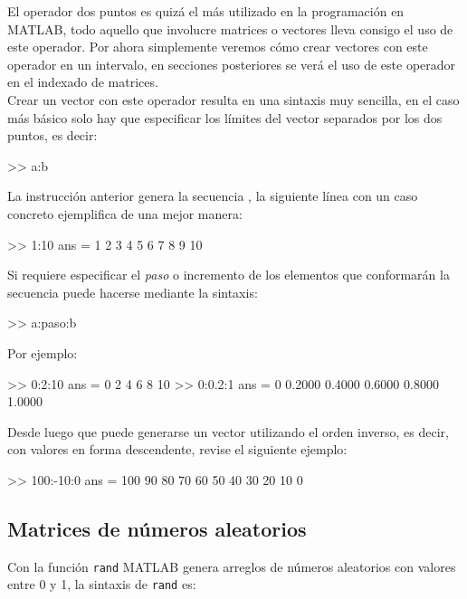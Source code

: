El operador dos puntos es quizá el más utilizado en la programación en
MATLAB, todo aquello que involucre matrices o vectores lleva consigo el
uso de este operador. Por ahora simplemente veremos cómo crear vectores
con este operador en un intervalo, en secciones posteriores se verá el
uso de este operador en el indexado de matrices.\\

Crear un vector con este operador resulta en una sintaxis muy sencilla,
en el caso más básico solo hay que especificar los límites del vector
separados por los dos puntos, es decir:

\begin{matlab}
>> a:b 
\end{matlab}

La instrucción anterior genera la secuencia , la siguiente línea con un
caso concreto ejemplifica de una mejor manera:

\begin{matlab}
>> 1:10
ans =
     1     2     3     4     5     6     7     8     9    10
\end{matlab}

Si requiere especificar el \emph{paso} o incremento de los elementos que
conformarán la secuencia puede hacerse mediante la sintaxis:

\begin{matlab}
>> a:paso:b 
\end{matlab}

Por ejemplo:

\begin{matlab}
>> 0:2:10
ans =
     0     2     4     6     8    10
>> 0:0.2:1
ans =
         0    0.2000    0.4000    0.6000    0.8000    1.0000
\end{matlab}

Desde luego que puede generarse un vector utilizando el orden inverso,
es decir, con valores en forma descendente, revise el siguiente ejemplo:

\begin{matlab}
>> 100:-10:0
ans =
   100    90    80    70    60    50    40    30    20    10     0
\end{matlab}

\subsection{Matrices de números aleatorios}\label{matrices-de-numeros-aleatorios}

Con la función \texttt{rand} MATLAB genera arreglos de números
aleatorios con valores entre 0 y 1, la sintaxis de \texttt{rand} es:

